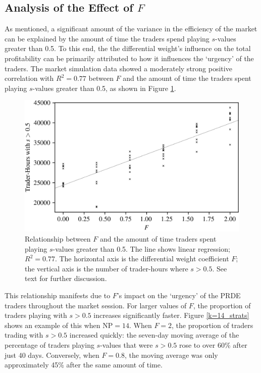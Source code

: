 \documentclass[a4paper,twoside]{article}
\begin{document}
\subsection{Analysis of the Effect of $F$}

As mentioned, a significant amount of the variance in the efficiency of the market can be explained by the amount of time the traders spend playing $s$-values greater than 0.5.
To this end, the the differential weight's influence on the total profitability can be primarily attributed to how it influences the `urgency' of the traders.
The market simulation data showed a moderately strong positive correlation with $R^2=0.77$ between $F$ and the amount of time the traders spent playing $s$-values greater than 0.5, as shown in Figure \ref{F_strats}.

\begin{figure}[htbp]
    \centerline{\includegraphics[width=\columnwidth]{F_strats.png}}
    \caption{
        Relationship between $F$ and the amount of time traders spent playing $s$-values greater than 0.5.
        The line shows linear regression; $R^2=0.77$.
        The horizontal axis is the differential weight coefficient $F$; the vertical axis is the number of trader-hours where $s>0.5$.
        See text for further discussion.
    }
    \label{F_strats}
\end{figure}

This relationship manifests due to $F$'s impact on the `urgency' of the PRDE traders throughout the market session.
For larger values of $F$, the proportion of traders playing with $s>0.5$ increases significantly faster.
Figure \ref{k=14_strats} shows an example of this when $\mathrm{NP}=14$.
When $F=2$, the proportion of traders trading with $s>0.5$ increased quickly: the seven-day moving average of the percentage of traders playing $s$-values that were $s>0.5$ rose to over 60\% after just 40 days.
Conversely, when $F=0.8$, the moving average was only approximately 45\% after the same amount of time.
\end{document}

